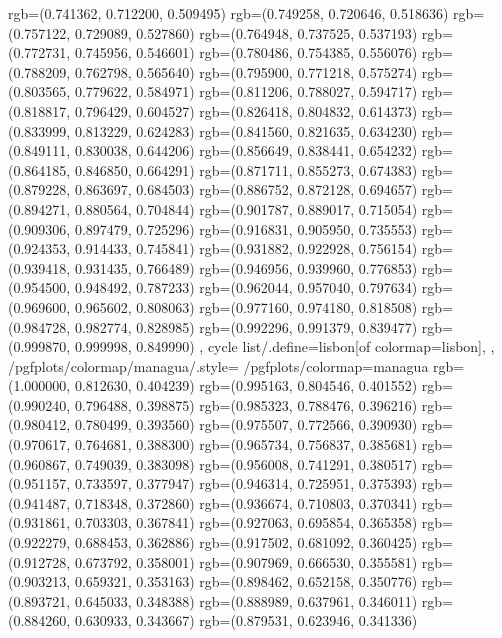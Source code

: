 {{{					rgb=(0.741362, 0.712200, 0.509495)
					rgb=(0.749258, 0.720646, 0.518636)
					rgb=(0.757122, 0.729089, 0.527860)
					rgb=(0.764948, 0.737525, 0.537193)
					rgb=(0.772731, 0.745956, 0.546601)
					rgb=(0.780486, 0.754385, 0.556076)
					rgb=(0.788209, 0.762798, 0.565640)
					rgb=(0.795900, 0.771218, 0.575274)
					rgb=(0.803565, 0.779622, 0.584971)
					rgb=(0.811206, 0.788027, 0.594717)
					rgb=(0.818817, 0.796429, 0.604527)
					rgb=(0.826418, 0.804832, 0.614373)
					rgb=(0.833999, 0.813229, 0.624283)
					rgb=(0.841560, 0.821635, 0.634230)
					rgb=(0.849111, 0.830038, 0.644206)
					rgb=(0.856649, 0.838441, 0.654232)
					rgb=(0.864185, 0.846850, 0.664291)
					rgb=(0.871711, 0.855273, 0.674383)
					rgb=(0.879228, 0.863697, 0.684503)
					rgb=(0.886752, 0.872128, 0.694657)
					rgb=(0.894271, 0.880564, 0.704844)
					rgb=(0.901787, 0.889017, 0.715054)
					rgb=(0.909306, 0.897479, 0.725296)
					rgb=(0.916831, 0.905950, 0.735553)
					rgb=(0.924353, 0.914433, 0.745841)
					rgb=(0.931882, 0.922928, 0.756154)
					rgb=(0.939418, 0.931435, 0.766489)
					rgb=(0.946956, 0.939960, 0.776853)
					rgb=(0.954500, 0.948492, 0.787233)
					rgb=(0.962044, 0.957040, 0.797634)
					rgb=(0.969600, 0.965602, 0.808063)
					rgb=(0.977160, 0.974180, 0.818508)
					rgb=(0.984728, 0.982774, 0.828985)
					rgb=(0.992296, 0.991379, 0.839477)
					rgb=(0.999870, 0.999998, 0.849990)
			},
		cycle list/.define={lisbon}{[of colormap=lisbon]},
		},
		/pgfplots/colormap/managua/.style={
			/pgfplots/colormap={managua}{%
					rgb=(1.000000, 0.812630, 0.404239)
					rgb=(0.995163, 0.804546, 0.401552)
					rgb=(0.990240, 0.796488, 0.398875)
					rgb=(0.985323, 0.788476, 0.396216)
					rgb=(0.980412, 0.780499, 0.393560)
					rgb=(0.975507, 0.772566, 0.390930)
					rgb=(0.970617, 0.764681, 0.388300)
					rgb=(0.965734, 0.756837, 0.385681)
					rgb=(0.960867, 0.749039, 0.383098)
					rgb=(0.956008, 0.741291, 0.380517)
					rgb=(0.951157, 0.733597, 0.377947)
					rgb=(0.946314, 0.725951, 0.375393)
					rgb=(0.941487, 0.718348, 0.372860)
					rgb=(0.936674, 0.710803, 0.370341)
					rgb=(0.931861, 0.703303, 0.367841)
					rgb=(0.927063, 0.695854, 0.365358)
					rgb=(0.922279, 0.688453, 0.362886)
					rgb=(0.917502, 0.681092, 0.360425)
					rgb=(0.912728, 0.673792, 0.358001)
					rgb=(0.907969, 0.666530, 0.355581)
					rgb=(0.903213, 0.659321, 0.353163)
					rgb=(0.898462, 0.652158, 0.350776)
					rgb=(0.893721, 0.645033, 0.348388)
					rgb=(0.888989, 0.637961, 0.346011)
					rgb=(0.884260, 0.630933, 0.343667)
					rgb=(0.879531, 0.623946, 0.341336)
}}}
